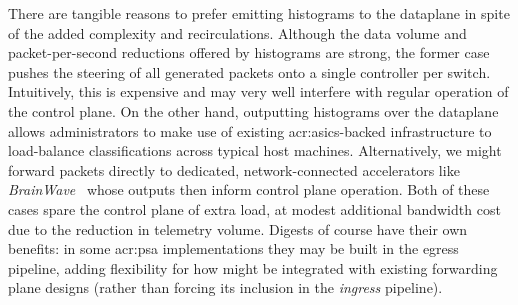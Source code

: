 There are tangible reasons to prefer emitting histograms to the dataplane in spite of the added complexity and recirculations.
Although the data volume and packet-per-second reductions offered by \seidr{} histograms are strong, the former case pushes the steering of all generated packets onto a single controller per switch.
Intuitively, this is expensive and may very well interfere with regular operation of the control plane.
On the other hand, outputting histograms over the dataplane allows administrators to make use of existing \glspl{acr:asic}-backed infrastructure to load-balance classifications across typical host machines.
Alternatively, we might forward packets directly to dedicated, network-connected accelerators like \emph{BrainWave}~\parencite{DBLP:conf/isca/FowersOPMLLAHAG18} whose outputs then inform control plane operation.
Both of these cases spare the control plane of extra load, at modest additional bandwidth cost due to the reduction in telemetry volume.
Digests of course have their own benefits: in some \gls{acr:psa} implementations they may be built in the egress pipeline, adding flexibility for how \seidr{} might be integrated with existing forwarding plane designs (rather than forcing its inclusion in the \emph{ingress} pipeline).

%
%


